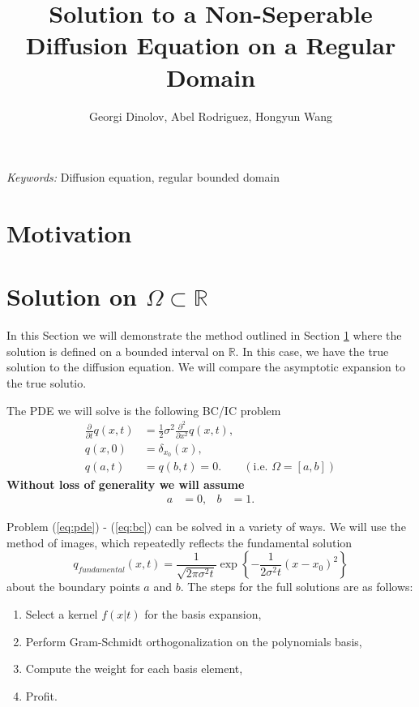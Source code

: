 \documentclass[10pt]{article}
\title{Solution to a Non-Seperable Diffusion Equation on a Regular Domain}
\author{Georgi Dinolov, Abel Rodriguez, Hongyun Wang}
\date{} %
\begin{document}
\def\spacingset#1{\renewcommand{\baselinestretch}%
{#1}\small\normalsize} \spacingset{1}

\bigskip

\abstract{}

\vspace{1cm}
\noindent
{\it Keywords:} Diffusion equation, regular bounded domain

\spacingset{1.00} %
\section{Motivation}\label{se:motivation}

\section{Solution on $\Omega \subset \mathbb{R}$}

In this Section we will demonstrate the method outlined in Section
\ref{se:motivation} where the solution is defined on a bounded
interval on $\mathbb{R}$. In this case, we have the true solution to
the diffusion equation. We will compare the asymptotic
expansion to the true solutio.

The PDE we will solve is the following BC/IC problem
\begin{align}
  \frac{\partial}{\partial t} q(x,t) &= \frac{1}{2}\sigma^2 \frac{\partial^2}{\partial x^2} q(x,t), \label{eq:pde} \\
  q(x,0) &= \delta_{x_0}(x), \label{eq:ic} \\
  q(a,t) &= q(b,t) = 0. & (\mbox{i.e. } \Omega = [a,b]) \label{eq:bc}
\end{align}
\textbf{Without loss of generality we will assume}
\begin{align*}
  a &=0, & b &= 1.
\end{align*}

Problem (\ref{eq:pde}) - (\ref{eq:bc}) can be solved in a variety of
ways. We will use the method of images, which repeatedly reflects the
fundamental solution
\[
  q_{fundamental}(x,t) = \frac{1}{\sqrt{2\pi \sigma^2 t}} \exp\left\{ -\frac{1}{2\sigma^2t} (x-x_0)^2 \right\}
\]
about the boundary points $a$ and $b$. The steps for the full
solutions are as follows:

\begin{enumerate}[Step 1:]
\item Select a kernel $f(x|t)$ for the basis expansion,
\item Perform Gram-Schmidt orthogonalization on the polynomials basis,
\item Compute the weight for each basis element,
\item Profit.
\end{enumerate}
\end{document}
